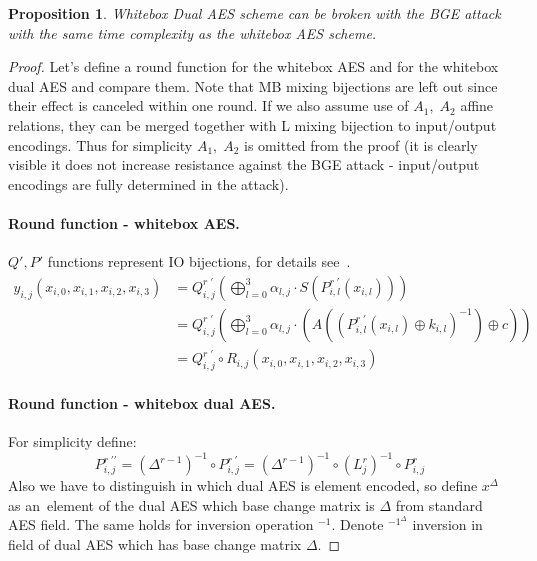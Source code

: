 \documentclass[11pt,oneside,final]{fithesis2}
\newtheorem{myprop}{Proposition}
\begin{document}
	\begin{myprop}
	Whitebox Dual AES scheme can be broken with the BGE attack with the same time complexity as the whitebox AES scheme.
	\end{myprop}

	\begin{proof}
	Let's define a round function for the whitebox AES and for the whitebox dual AES and compare them. 
	Note that MB mixing bijections are left out since their effect is canceled within one round. If we also assume use of $A_1, \; A_2$ affine relations,
	they can be merged together with L mixing bijection to input/output encodings. Thus for simplicity $A_1, \; A_2$ is omitted from the proof (it is clearly visible 
	it does not increase resistance against the BGE attack - input/output encodings are fully determined in the attack).

	\paragraph*{Round function - whitebox AES.}
	$Q' ,P' $ functions represent IO bijections, for details see~\citep{Chow02white-boxcryptography, Billet:2004:CWB:2080787.2080809}.
	\begin{subequations}
	\begin{align} 
	y_{i,j}\left(x_{i,0}, x_{i,1}, x_{i,2}, x_{i,3}\right)  &= Q^{r \; \prime}_{i,j}\left( \bigoplus^3_{l=0} \alpha_{l,j} \cdot S \left(P^{r \; \prime}_{i,l}\left(x_{i,l}\right) \right) \right) \\
								&= Q^{r \; \prime}_{i,j}\left( \bigoplus^3_{l=0} \alpha_{l,j} \cdot \left( A \left( \left(P^{r \; \prime}_{i,l}\left(x_{i,l}\right) \oplus k_{i,l} \right)^{-1} \right) \oplus c \right) \right) \\
								&= Q^{r \; \prime}_{i,j} \circ R_{i,j}\left(x_{i,0}, x_{i,1}, x_{i,2}, x_{i,3}\right) \label{eq:whitebox_aes_roud}
	\end{align}
	\end{subequations}

	\paragraph*{Round function - whitebox dual AES.}
	For simplicity define:
	\begin{equation}
	    P^{r \; \prime\prime}_{i,j} = \left(\Delta^{r-1}\right)^{-1} \circ P^{r \; \prime}_{i,j} = \left(\Delta^{r-1}\right)^{-1} \circ (L^{r}_{j})^{-1} \circ P^{r}_{i,j} \label{eq:ioencoding_abstract_p}
	\end{equation}
	Also we have to distinguish in which dual AES is element encoded, so define $x^{\Delta}$ as an~element of the dual AES which base change matrix is $\Delta$ from standard AES field. 
	The same holds for inversion operation $^{-1}$. Denote $^{-1^{\Delta}}$ inversion in field of dual AES which has base change matrix $\Delta$.
	

\end{proof}
\end{document}
